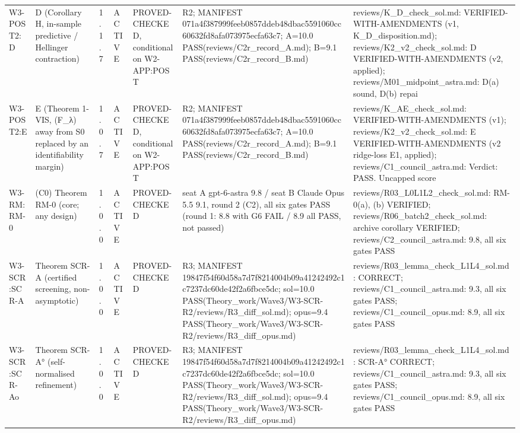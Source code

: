 \begin{longtable}{p{2.2cm}p{2.2cm}p{0.7cm}p{1.2cm}p{3.2cm}p{1.8cm}p{3cm}}
W3-POST2:D & D (Corollary H, in-sample predictive / Hellinger contraction) & 1.1.7 & ACTIVE & PROVED-CHECKED, conditional on W2-APP:POST & R2; MANIFEST 071a4f387999feeb0857ddeb48dbac5591060cc60632fd8afa073975ecfa63c7; A=10.0 PASS(reviews/C2r\_record\_A.md); B=9.1 PASS(reviews/C2r\_record\_B.md) & reviews/K\_D\_check\_sol.md: VERIFIED-WITH-AMENDMENTS (v1, K\_D\_disposition.md); reviews/K2\_v2\_check\_sol.md: D VERIFIED-WITH-AMENDMENTS (v2, applied); reviews/M01\_midpoint\_astra.md: D(a) sound, D(b) repai \\
W3-POST2:E & E (Theorem 1-VIS, (F\_λ) away from S0 replaced by an identifiability margin) & 1.0.7 & ACTIVE & PROVED-CHECKED, conditional on W2-APP:POST & R2; MANIFEST 071a4f387999feeb0857ddeb48dbac5591060cc60632fd8afa073975ecfa63c7; A=10.0 PASS(reviews/C2r\_record\_A.md); B=9.1 PASS(reviews/C2r\_record\_B.md) & reviews/K\_AE\_check\_sol.md: VERIFIED-WITH-AMENDMENTS (v1); reviews/K2\_v2\_check\_sol.md: E VERIFIED-WITH-AMENDMENTS (v2 ridge-loss E1, applied); reviews/C1\_council\_astra.md: Verdict: PASS. Uncapped score \\
W3-RM:RM-0 & (C0) Theorem RM-0 (core; any design) & 1.0.0 & ACTIVE & PROVED-CHECKED & seat A gpt-6-astra 9.8 / seat B Claude Opus 5.5 9.1, round 2 (C2), all six gates PASS (round 1: 8.8 with G6 FAIL / 8.9 all PASS, not passed) & reviews/R03\_L0L1L2\_check\_sol.md: RM-0(a), (b) VERIFIED; reviews/R06\_batch2\_check\_sol.md: archive corollary VERIFIED; reviews/C2\_council\_astra.md: 9.8, all six gates PASS \\
W3-SCR:SCR-A & Theorem SCR-A (certified screening, non-asymptotic) & 1.0.0 & ACTIVE & PROVED-CHECKED & R3; MANIFEST 19847f54f60d58a7d7f8214004b09a41242492c1c7237dc60de42f2a6fbce5dc; sol=10.0 PASS(Theory\_work/Wave3/W3-SCR-R2/reviews/R3\_diff\_sol.md); opus=9.4 PASS(Theory\_work/Wave3/W3-SCR-R2/reviews/R3\_diff\_opus.md) & reviews/R03\_lemma\_check\_L1L4\_sol.md: CORRECT; reviews/C1\_council\_astra.md: 9.3, all six gates PASS; reviews/C1\_council\_opus.md: 8.9, all six gates PASS \\
W3-SCR:SCR-Ao & Theorem SCR-A° (self-normalised refinement) & 1.0.0 & ACTIVE & PROVED-CHECKED & R3; MANIFEST 19847f54f60d58a7d7f8214004b09a41242492c1c7237dc60de42f2a6fbce5dc; sol=10.0 PASS(Theory\_work/Wave3/W3-SCR-R2/reviews/R3\_diff\_sol.md); opus=9.4 PASS(Theory\_work/Wave3/W3-SCR-R2/reviews/R3\_diff\_opus.md) & reviews/R03\_lemma\_check\_L1L4\_sol.md: SCR-A° CORRECT; reviews/C1\_council\_astra.md: 9.3, all six gates PASS; reviews/C1\_council\_opus.md: 8.9, all six gates PASS \\

\end{longtable}
